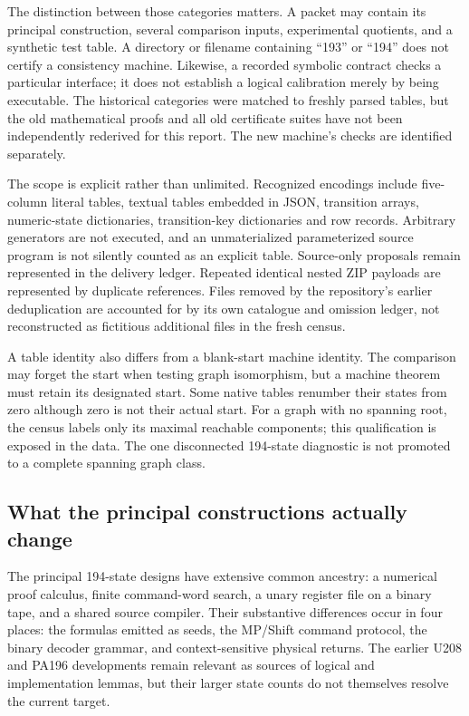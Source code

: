 The distinction between those categories matters.  A packet may contain its
principal construction, several comparison inputs, experimental quotients,
and a synthetic test table.  A directory or filename containing ``193'' or
``194'' does not certify a consistency machine.  Likewise, a recorded
symbolic contract checks a particular interface; it does not establish a
logical calibration merely by being executable.  The historical categories
were matched to freshly parsed tables, but the old mathematical proofs and
all old certificate suites have not been independently rederived for this
report.  The new machine's checks are identified separately.

The scope is explicit rather than unlimited.  Recognized encodings include
five-column literal tables, textual tables embedded in JSON, transition
arrays, numeric-state dictionaries, transition-key dictionaries and row
records.  Arbitrary generators are not executed, and an unmaterialized
parameterized source program is not silently counted as an explicit table.
Source-only proposals remain represented in the delivery ledger.  Repeated
identical nested ZIP payloads are represented by duplicate references.
Files removed by the repository's earlier deduplication are accounted for
by its own catalogue and omission ledger, not reconstructed as fictitious
additional files in the fresh census.

A table identity also differs from a blank-start machine identity.  The
comparison may forget the start when testing graph isomorphism, but a
machine theorem must retain its designated start.  Some native tables
renumber their states from zero although zero is not their actual start.
For a graph with no spanning root, the census labels only its maximal
reachable components; this qualification is exposed in the data.  The
one disconnected 194-state diagnostic is not promoted to a complete
spanning graph class.

\subsection{What the principal constructions actually change}
\label{cmp:mechanisms}

The principal 194-state designs have extensive common ancestry: a
numerical proof calculus, finite command-word search, a unary register
file on a binary tape, and a shared source compiler.  Their substantive
differences occur in four places: the formulas emitted as seeds, the
MP/Shift command protocol, the binary decoder grammar, and context-sensitive
physical returns.  The earlier U208 and PA196 developments remain relevant
as sources of logical and implementation lemmas, but their larger state
counts do not themselves resolve the current target.\cite{repo,ax11packet}

